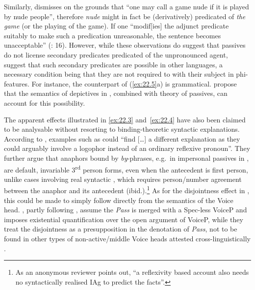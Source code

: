 \documentclass[output=paper]{langsci/langscibook}
\begin{document}
Similarly, \citet{Williams1985} dismisses  on the grounds that
“one may call a game nude if it is played by nude people”, therefore
\emph{nude} might in fact be (derivatively) predicated of \emph{the}
\emph{game} (or the playing of the game).  If one “modif[ies] the adjunct
predicate suitably to make such a predication unreasonable, the sentence
becomes unacceptable” (\citealt{BhattPancheva2006}: 16).  However, while these
observations do suggest that  passives do not license secondary
predicates predicated of the unpronounced agent, \citet{AlexiadouEtAl2015}
suggest that such secondary predicates are possible in other languages, a
necessary condition being that they are not required to  with their
subject in phi-features. For instance, the  counterpart of
(\ref{ex:22.5}a) is grammatical. \citet{PitteroffSchafer2017} propose that
the semantics of depictives in \citet{Pylkkanen2008}, combined with
 theory of passives, can account for this possibility.

The apparent  effects illustrated in \eqref{ex:22.3}
and~\eqref{ex:22.4} have also been claimed to be analysable without
resorting to binding-theoretic syntactic explanations.  According to
\citet[219]{AlexiadouEtAl2015}, examples such as  could “find
[\dots{}] a different explanation as they could arguably involve a logophor
instead of an ordinary reflexive pronoun”. They further argue that anaphors
bound by \emph{by}-phrases, e.g.\ in impersonal passives in ,
are default, invariable 3\textsuperscript{rd} person forms, even when the
antecedent is first person, unlike cases involving real syntactic ,
which requires person/number agreement between the anaphor and its antecedent
(ibid.).\footnote{As an anonymous reviewer points out, “a reflexivity
based account also needs no syntactically realised \gls{IAg} to predict the facts”.}  As for the disjointness effect in
, this could be made to simply follow directly from the
semantics of the  Voice head.  \citet{SpathasEtAl2015}, partly
following \citet{Bruening2014}, assume the \emph{Pass} is merged with a
Spec-less VoiceP and imposes existential quantification over the open argument
of VoiceP, while they treat the disjointness as a presupposition in the
denotation of \emph{Pass}, not to be found in other types of non-active/middle
Voice heads attested cross-linguistically .
\end{document}
